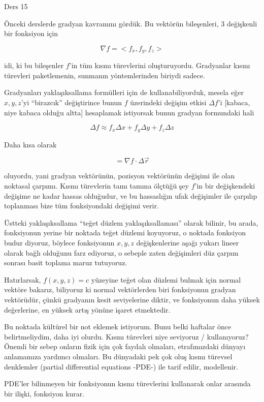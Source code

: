 \documentclass[12pt,fleqn]{article}\usepackage{../../common}
\begin{document}
Ders 15

Önceki derslerde gradyan kavramını gördük. Bu vektörün bileşenleri, 3
değişkenli bir fonksiyon için

$$ 
\nabla f = < f_x, f_y, f_z > 
$$

idi, ki bu bileşenler $f$'in tüm kısmı türevlerini
oluşturuyordu. Gradyanlar kısmı türevleri paketlemenin, sunmanın
yöntemlerinden biriydi sadece.

Gradyanları yaklaşıksallama formülleri için de kullanabiliyorduk, mesela
eğer $x,y,z$'yi ``birazcık'' değiştirince bunun $f$ üzerindeki değişim
etkisi $\Delta f$'i [kabaca, niye kabaca olduğu altta] hesaplamak
istiyorsak bunun gradyan formundaki hali

$$ \Delta f \approx f_x \Delta x + f_y \Delta y + f_z \Delta z $$

Daha kısa olarak 

$$ = \nabla f \cdot \Delta \vec{r} $$

oluyordu, yani gradyan vektörünün, pozisyon vektörünün değişimi ile olan
noktasal çarpımı. Kısmı türevlerin tamı tamına ölçtüğü şey $f$'in bir
değişkendeki değişime ne kadar hassas olduğudur, ve bu hassaslığın ufak
değişimler ile çarpılıp toplanması bize tüm fonksiyondaki değişimi verir.

Üstteki yaklaşıksallama ``teğet düzlem yaklaşıksallaması'' olarak bilinir,
bu arada, fonksiyonun yerine bir noktada teğet düzlemi koyuyoruz, o noktada
fonksiyon budur diyoruz, böylece fonksiyonun $x,y,z$ değişkenlerine aşağı
yukarı lineer olarak bağlı olduğunu farz ediyoruz, o sebeple zaten
değişimleri düz çarpım sonrası basit toplama maruz tutuyoruz. 

Hatırlarsak, $f(x,y,z)=c$ yüzeyine teğet olan düzlemi bulmak için normal
vektöre bakarız, biliyoruz ki normal vektörlerden biri fonksiyonun gradyan
vektörüdür, çünkü gradyanın kesit seviyelerine diktir, ve fonksiyonun daha
yüksek değerlerine, en yüksek artış yönüne işaret etmektedir. 

Bu noktada kültürel bir not eklemek istiyorum. Bunu belki haftalar önce
belirtmeliydim, daha iyi olurdu. Kısmı türevleri niye seviyoruz /
kullanıyoruz? Önemli bir sebep onların fizik için çok faydalı olmaları,
etrafımızdaki dünyayı anlamamıza yardımcı olmaları. Bu dünyadaki pek çok
oluş kısmı türevsel denklemler (partial differential equations -PDE-) ile
tarif edilir, modellenir.

PDE'ler bilinmeyen bir fonksiyonun kısmı türevlerini kullanarak onlar
arasında bir ilişki, fonksiyon kurar. 
\end{document}
